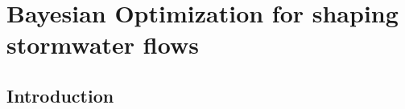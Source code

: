 \chapter{Bayesian Optimization for shaping stormwater flows}\label{ch:bayes}
\vspace{1cm}

\section{Introduction}
